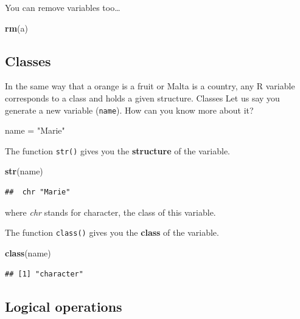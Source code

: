 \documentclass[
]{book}
\newenvironment{Shaded}{\begin{snugshade}}{\end{snugshade}}
\newcommand{\FunctionTok}[1]{\textcolor[rgb]{0.13,0.29,0.53}{\textbf{#1}}}
\newcommand{\NormalTok}[1]{#1}
\newcommand{\OtherTok}[1]{\textcolor[rgb]{0.56,0.35,0.01}{#1}}
\newcommand{\StringTok}[1]{\textcolor[rgb]{0.31,0.60,0.02}{#1}}
\begin{document}
You can remove variables too\ldots{}

\begin{Shaded}
\begin{Highlighting}[]
\FunctionTok{rm}\NormalTok{(a)}
\end{Highlighting}
\end{Shaded}

\hypertarget{classes}{%
\subsection*{Classes}\label{classes}}

In the same way that a orange is a fruit or Malta is a country, any R variable corresponds to a class and holds a given structure.
Classes Let us say you generate a new variable (\texttt{name}).
How can you know more about it?

\begin{Shaded}
\begin{Highlighting}[]
\NormalTok{name }\OtherTok{=} \StringTok{"Marie"}
\end{Highlighting}
\end{Shaded}

The function \texttt{str()} gives you the \textbf{structure} of the variable.

\begin{Shaded}
\begin{Highlighting}[]
\FunctionTok{str}\NormalTok{(name)}
\end{Highlighting}
\end{Shaded}

\begin{verbatim}
##  chr "Marie"
\end{verbatim}

where \emph{chr} stands for character, the class of this variable.

The function \texttt{class()} gives you the \textbf{class} of the variable.

\begin{Shaded}
\begin{Highlighting}[]
\FunctionTok{class}\NormalTok{(name)}
\end{Highlighting}
\end{Shaded}

\begin{verbatim}
## [1] "character"
\end{verbatim}

\hypertarget{logical-operations}{%
\subsection*{Logical operations}\label{logical-operations}}
\end{document}
